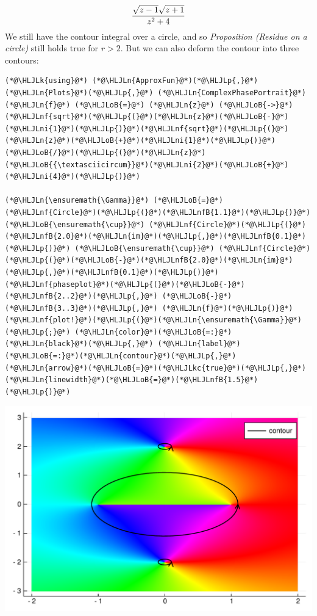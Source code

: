 \documentclass[12pt,a4paper]{article}
\newcommand{\HLJLk}[1]{\textcolor[RGB]{148,91,176}{\textbf{#1}}}
\newcommand{\HLJLkc}[1]{\textcolor[RGB]{59,151,46}{\textit{#1}}}
\newcommand{\HLJLn}[1]{#1}
\newcommand{\HLJLnf}[1]{\textcolor[RGB]{66,102,213}{#1}}
\newcommand{\HLJLnfB}[1]{\textcolor[RGB]{59,151,46}{#1}}
\newcommand{\HLJLni}[1]{\textcolor[RGB]{59,151,46}{#1}}
\newcommand{\HLJLoB}[1]{\textcolor[RGB]{102,102,102}{\textbf{#1}}}
\newcommand{\HLJLp}[1]{#1}
\begin{document}
\[
    {\sqrt{z-1}\sqrt{z+1} \over z^2 + 4}
\]
We still have the contour integral over a circle, and so \emph{Proposition (Residue on a circle)} still holds true for $r > 2$. But we can also deform the contour into three contours:


\begin{lstlisting}
(*@\HLJLk{using}@*) (*@\HLJLn{ApproxFun}@*)(*@\HLJLp{,}@*) (*@\HLJLn{Plots}@*)(*@\HLJLp{,}@*) (*@\HLJLn{ComplexPhasePortrait}@*)
(*@\HLJLn{f}@*) (*@\HLJLoB{=}@*) (*@\HLJLn{z}@*) (*@\HLJLoB{->}@*) (*@\HLJLnf{sqrt}@*)(*@\HLJLp{(}@*)(*@\HLJLn{z}@*)(*@\HLJLoB{-}@*)(*@\HLJLni{1}@*)(*@\HLJLp{)}@*)(*@\HLJLnf{sqrt}@*)(*@\HLJLp{(}@*)(*@\HLJLn{z}@*)(*@\HLJLoB{+}@*)(*@\HLJLni{1}@*)(*@\HLJLp{)}@*)(*@\HLJLoB{/}@*)(*@\HLJLp{(}@*)(*@\HLJLn{z}@*)(*@\HLJLoB{{\textasciicircum}}@*)(*@\HLJLni{2}@*)(*@\HLJLoB{+}@*)(*@\HLJLni{4}@*)(*@\HLJLp{)}@*)

(*@\HLJLn{\ensuremath{\Gamma}}@*) (*@\HLJLoB{=}@*) (*@\HLJLnf{Circle}@*)(*@\HLJLp{(}@*)(*@\HLJLnfB{1.1}@*)(*@\HLJLp{)}@*) (*@\HLJLoB{\ensuremath{\cup}}@*) (*@\HLJLnf{Circle}@*)(*@\HLJLp{(}@*)(*@\HLJLnfB{2.0}@*)(*@\HLJLn{im}@*)(*@\HLJLp{,}@*)(*@\HLJLnfB{0.1}@*)(*@\HLJLp{)}@*) (*@\HLJLoB{\ensuremath{\cup}}@*) (*@\HLJLnf{Circle}@*)(*@\HLJLp{(}@*)(*@\HLJLoB{-}@*)(*@\HLJLnfB{2.0}@*)(*@\HLJLn{im}@*)(*@\HLJLp{,}@*)(*@\HLJLnfB{0.1}@*)(*@\HLJLp{)}@*)
(*@\HLJLnf{phaseplot}@*)(*@\HLJLp{(}@*)(*@\HLJLoB{-}@*)(*@\HLJLnfB{2..2}@*)(*@\HLJLp{,}@*) (*@\HLJLoB{-}@*)(*@\HLJLnfB{3..3}@*)(*@\HLJLp{,}@*) (*@\HLJLn{f}@*)(*@\HLJLp{)}@*)
(*@\HLJLnf{plot!}@*)(*@\HLJLp{(}@*)(*@\HLJLn{\ensuremath{\Gamma}}@*)(*@\HLJLp{;}@*) (*@\HLJLn{color}@*)(*@\HLJLoB{=:}@*)(*@\HLJLn{black}@*)(*@\HLJLp{,}@*) (*@\HLJLn{label}@*)(*@\HLJLoB{=:}@*)(*@\HLJLn{contour}@*)(*@\HLJLp{,}@*) (*@\HLJLn{arrow}@*)(*@\HLJLoB{=}@*)(*@\HLJLkc{true}@*)(*@\HLJLp{,}@*) (*@\HLJLn{linewidth}@*)(*@\HLJLoB{=}@*)(*@\HLJLnfB{1.5}@*)(*@\HLJLp{)}@*)
\end{lstlisting}

\includegraphics[width=\linewidth]{figures/Lecture3_1_1.pdf}
\end{document}
